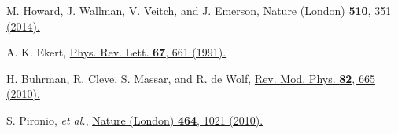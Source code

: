 \documentclass[prl,letterpaper,english,reprint,nofootinbib,aps,superscriptaddress,showpacs,showkeys]{revtex4-1}
\theoremstyle{definition}
\theoremstyle{remark}
\begin{document}
\begin{thebibliography}{10}



 M. Howard, J. Wallman, V. Veitch, and J. Emerson,
\href{https://www.nature.com/articles/nature13460}
{Nature (London) \textbf{510}, 351 (2014).}








 A. K. Ekert,
 \href{http://journals.aps.org/prl/abstract/10.1103/PhysRevLett.67.661}{Phys. Rev. Lett. \textbf{67}, 661 (1991).}

%
%

 H. Buhrman, R. Cleve, S. Massar, and R. de Wolf,
 \href{http://journals.aps.org/rmp/abstract/10.1103/RevModPhys.82.665}{Rev. Mod. Phys. \textbf{82}, 665 (2010).}


 S. Pironio, \emph{et al.},
 \href{http://www.nature.com/nature/journal/v464/n7291/full/nature09008.html}{Nature (London) \textbf{464}, 1021 (2010).}



\end{thebibliography}
\end{document}
